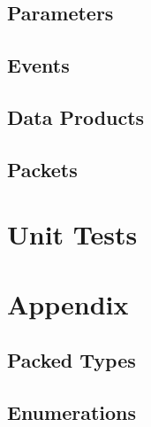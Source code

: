 

\subsection{Parameters}



\subsection{Events}



\subsection{Data Products}



\subsection{Packets}



\section{Unit Tests}



\section{Appendix}
\subsection{Packed Types}



\subsection{Enumerations}




